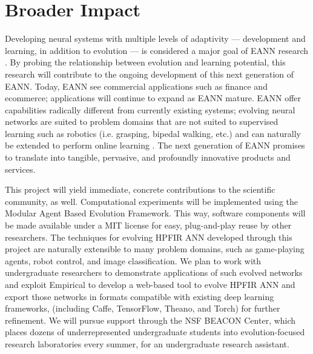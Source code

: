 \section{Broader Impact}

Developing neural systems with multiple levels of adaptivity --- development and learning, in addition to evolution --- is considered a major goal of EANN research \autocite{Downing2015IntelligenceSystems}.
By probing the relationship between evolution and learning potential, this research will contribute to the ongoing development of this next generation of EANN.
Today, EANN see commercial applications such as finance and ecommerce; applications will continue to expand as EANN mature.
EANN offer capabilities radically different from currently existing systems; evolving neural networks are suited to problem domains that are not suited to supervised learning such as robotics (i.e. grasping, bipedal walking, etc.) \autocite{Downing2015IntelligenceSystems} and can naturally be extended to perform online learning \autocite{Tonelli2013OnNetworks}.
The next generation of EANN promises to translate into tangible, pervasive, and profoundly innovative products and services.

This project will yield immediate, concrete contributions to the scientific community, as well.
Computational experiments will be implemented using the Modular Agent Based Evolution Framework.\autocite{Hintze2017Mabe}
This way, software components will be made available under a MIT license for easy, plug-and-play reuse by other researchers.
The techniques for evolving HPFIR ANN developed through this project are naturally extensible to many problem domains, such as game-playing agents, robot control, and image classification.
We plan to work with undergraduate researchers to demonstrate applications of such evolved networks and exploit Empirical to develop a web-based tool to evolve HPFIR ANN and export those networks in formats compatible with existing deep learning frameworks, (including Caffe, TensorFlow, Theano, and Torch) for further refinement.
We will pursue support through the NSF BEACON Center, which places dozens of underrepresented undergraduate students into evolution-focused research laboratories every summer, for an undergraduate research assistant.

